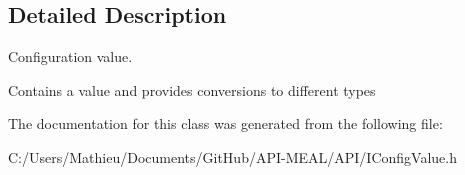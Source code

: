\subsection{Detailed Description}
Configuration value. 

Contains a value and provides conversions to different types 

The documentation for this class was generated from the following file\+:\begin{DoxyCompactItemize}
\item 
C\+:/\+Users/\+Mathieu/\+Documents/\+Git\+Hub/\+A\+P\+I-\/\+M\+E\+A\+L/\+A\+P\+I/I\+Config\+Value.\+h\end{DoxyCompactItemize}
